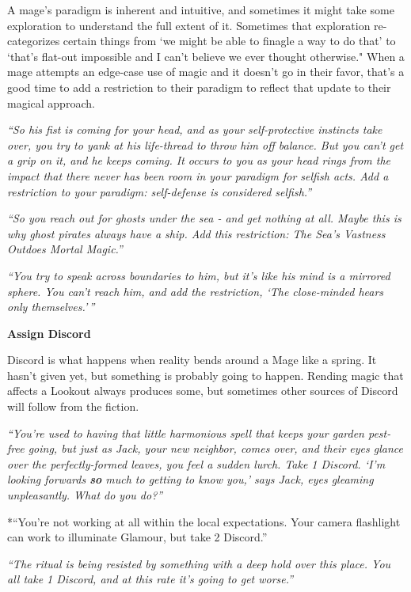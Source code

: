 \documentclass[
  oneside,
  statementpaper,
  9pt]{memoir}
\begin{document}
A mage's paradigm is inherent and intuitive, and sometimes it might take
some exploration to understand the full extent of it. Sometimes that
exploration re-categorizes certain things from `we might be able to
finagle a way to do that' to `that's flat-out impossible and I can't
believe we ever thought otherwise." When a mage attempts an edge-case
use of magic and it doesn't go in their favor, that's a good time to add
a restriction to their paradigm to reflect that update to their magical
approach.

\emph{``So his fist is coming for your head, and as your self-protective
instincts take over, you try to yank at his life-thread to throw him off
balance. But you can't get a grip on it, and he keeps coming. It occurs
to you as your head rings from the impact that there never has been room
in your paradigm for selfish acts. Add a restriction to your paradigm:
self-defense is considered selfish.''}

\emph{``So you reach out for ghosts under the sea - and get nothing at
all. Maybe this is why ghost pirates always have a ship. Add this
restriction: The Sea's Vastness Outdoes Mortal Magic.''}

\emph{``You try to speak across boundaries to him, but it's like his
mind is a mirrored sphere. You can't reach him, and add the restriction,
`The close-minded hears only themselves.'\,''}

\textbf{Assign Discord}

Discord is what happens when reality bends around a Mage like a spring.
It hasn't given yet, but something is probably going to happen. Rending
magic that affects a Lookout always produces some, but sometimes other
sources of Discord will follow from the fiction.

\emph{``You're used to having that little harmonious spell that keeps
your garden pest-free going, but just as Jack, your new neighbor, comes
over, and their eyes glance over the perfectly-formed leaves, you feel a
sudden lurch. Take 1 Discord. `I'm looking forwards
\textbf{\emph{\emph{so}}} much to getting to know you,' says Jack, eyes
gleaming unpleasantly. What do you do?''}

*``You're not working at all within the local expectations. Your camera
flashlight can work to illuminate Glamour, but take 2 Discord.''

\emph{``The ritual is being resisted by something with a deep hold over
this place. You all take 1 Discord, and at this rate it's going to get
worse.''}
\end{document}

